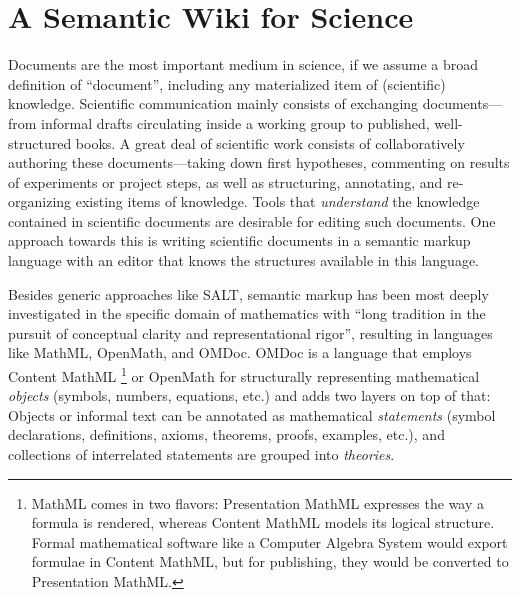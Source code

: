 \section{A Semantic Wiki for Science}

\begin{figure}
  \centering
  \vspace{-.9cm}
  \vspace{-1.2cm}
\end{figure}
Documents are the most important medium in science, if we assume a broad definition of
``document'', including any materialized item of (scientific) knowledge.  Scientific
communication mainly consists of exchanging documents---from informal drafts circulating
inside a working group to published, well-structured books.  A great deal of scientific
work consists of collaboratively authoring these documents---taking down first hypotheses,
commenting on results of experiments or project steps, as well as structuring, annotating,
and re-organizing existing items of knowledge.  Tools that
\emph{understand} the knowledge contained in scientific documents are desirable for
editing such documents.  One approach towards this is writing scientific documents in a
semantic markup language with an editor that knows the structures available in this
language.

Besides generic approaches like SALT\cite{Groza:SALT07}, semantic markup has been most
deeply investigated in the specific domain of mathematics with ``long tradition in the
pursuit of conceptual clarity and representational rigor''\cite{Kohlhase:omdoc1.2},
resulting in languages like MathML\cite{CarlisleEd:MathML07},
OpenMath\cite{BusCapCar:2oms04}, and OMDoc\cite{Kohlhase:omdoc1.2}.  OMDoc is a language
that employs Content MathML
\footnote{MathML comes in two flavors: Presentation MathML
  expresses the way a formula is rendered, whereas Content MathML models its logical
  structure.  Formal mathematical software like a Computer Algebra System would export
  formulae in Content MathML, but for publishing, they would be converted to Presentation
  MathML.} 
or OpenMath for structurally representing mathematical \emph{objects} (symbols,
numbers, equations, etc.) and adds two layers on top of that: Objects or informal text can
be annotated as mathematical \emph{statements} (symbol declarations, definitions, axioms,
theorems, proofs, examples, etc.), and collections of interrelated statements are grouped
into \emph{theories}.


